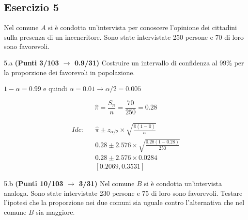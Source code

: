 \documentclass[
  11pt,
]{book}
\theoremstyle{mytheoremstyle}
\theoremstyle{mydefstyle}
\newenvironment{sol}
  {
  \begin{tcolorbox}[enhanced,breakable,arc=0.1mm,boxrule=1pt,colback=white,colframe=iblue,
  title=\bf \fontfamily{lmss}\selectfont \hspace{.5 cm} Soluzione,drop fuzzy shadow]

}{
\end{tcolorbox}
  }
\begin{document}
\subsection{Esercizio 5}\label{esercizio-5-26}

Nel comune \(A\) si è condotta un'intervista per conoscere l'opinione
dei cittadini sulla presenza di un inceneritore. Sono state intervistate
250 persone e 70 di loro sono favorevoli.

5.a \textbf{(Punti 3/103 \(\rightarrow\) 0.9/31)} Costruire un intervallo di confidenza al 99\%
per la proporzione dei favorevoli in popolazione.

\begin{sol}
\(1-\alpha =0.99\) e quindi \(\alpha=0.01\rightarrow \alpha/2=0.005\)

\[
  \hat\pi = \frac{S_n}n = \frac{ 70 }{ 250 }= 0.28 
\]

\begin{eqnarray*}
  Idc: & &  \hat\pi \pm  z_{\alpha/2} \times \sqrt{\frac{\hat\pi(1-\hat\pi)}{n}} \\
     & &  0.28 \pm  2.576 \times \sqrt{\frac{ 0.28 (1- 0.28 )}{ 250 }} \\
     & &  0.28 \pm  2.576 \times  0.0284 \\
     & & [ 0.2069 ,  0.3531 ]
\end{eqnarray*}

\end{sol}

5.b \textbf{(Punti 10/103 \(\rightarrow\) 3/31)} Nel comune \(B\) si è condotta un'intervista analoga.
Sono state intervistate 230 persone e 75 di loro sono favorevoli. Testare
l'ipotesi che la proporzione nei due comuni sia uguale contro l'alternativa che nel
comune \(B\) sia maggiore.
\end{document}
